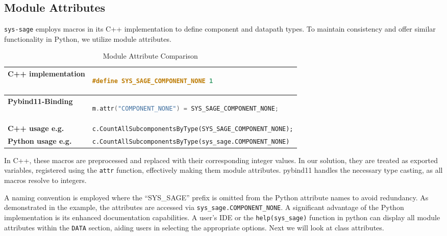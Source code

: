 \subsection{Module Attributes}

\verb|sys-sage| employs macros in its C++ implementation to define component and datapath types. To maintain consistency and offer similar functionality in Python, we utilize module attributes. 

\begin{table}[htbp]
\centering
\begin{tabular}{|l|l|}
\hline
\textbf{C++ implementation} & \begin{lstlisting}[language=C++]
#define SYS_SAGE_COMPONENT_NONE 1 
\end{lstlisting} \\ \hline
\textbf{Pybind11-Binding} & \begin{lstlisting}[language=C++]
m.attr("COMPONENT_NONE") = SYS_SAGE_COMPONENT_NONE;
\end{lstlisting} \\ \hline
\textbf{C++ usage e.g.} & \verb|c.CountAllSubcomponentsByType(SYS_SAGE_COMPONENT_NONE);| \\ \hline
\textbf{Python usage e.g.} & \verb|c.CountAllSubcomponentsByType(sys_sage.COMPONENT_NONE)| \\ \hline
\end{tabular}
\caption{Module Attribute Comparison}
\label{tab:module_attributes}
\end{table}

In C++, these macros are preprocessed and replaced with their corresponding integer values. In our solution, they are treated as exported variables, registered using the \verb|attr| function, effectively making them module attributes. pybind11 handles the necessary type casting, as all macros resolve to integers.\cite[see The Basics/First Steps]{pybind11-docu}

A naming convention is employed where the “SYS\_SAGE” prefix is omitted from the Python attribute names to avoid redundancy. As demonstrated in the example, the attributes are accessed via \verb|sys_sage.COMPONENT_NONE|.
A significant advantage of the Python implementation is its enhanced documentation capabilities. A user's \ac{IDE} or the \verb|help(sys_sage)| function in python can display all module attributes within the \verb|DATA| section, aiding users in selecting the appropriate options.
\smallskip
Next we will look at class attributes.

